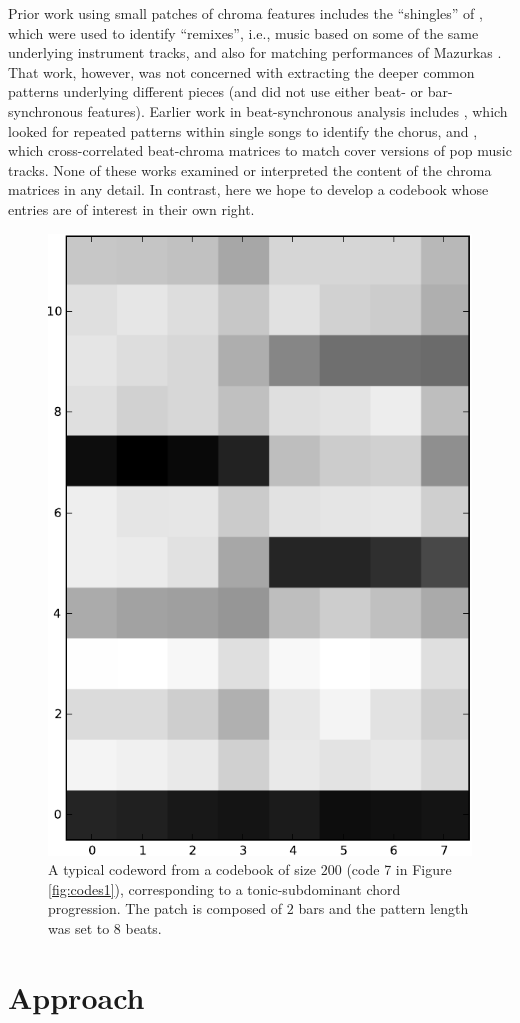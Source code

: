 \documentclass{article}
\begin{document}
Prior work using small patches of chroma features includes
the ``shingles'' of \cite{Casey2007}, which were used to
identify ``remixes'', i.e., music based on some of the same
underlying instrument tracks, and also for matching
performances of Mazurkas \cite{Casey2008}.  That work,
however, was not concerned with extracting the deeper
common patterns underlying different pieces (and did not
use either beat- or bar-synchronous features).  Earlier work in
beat-synchronous analysis includes \cite{Bartsch2001},
which looked for repeated patterns within single songs to
identify the chorus, and \cite{Ellis2007a}, which 
cross-correlated beat-chroma matrices to match cover
versions of pop music tracks.  None of these works
examined or interpreted the content of the chroma
matrices in any detail.  In contrast, here we hope to
develop a codebook whose entries are of interest
in their own right.


\begin{figure}[thb]
\begin{center}
\includegraphics[width=.4\columnwidth]{code}
\end{center}
\caption{\small{A typical codeword from a codebook of size $200$ (code
    7 in Figure \ref{fig:codes1}), corresponding to a
    tonic-subdominant chord progression.  The patch is composed of $2$
    bars and the pattern length was set to $8$ beats.  }}
\label{fig:code}
\end{figure}


\section{Approach}\label{sec:approach}
\end{document}
